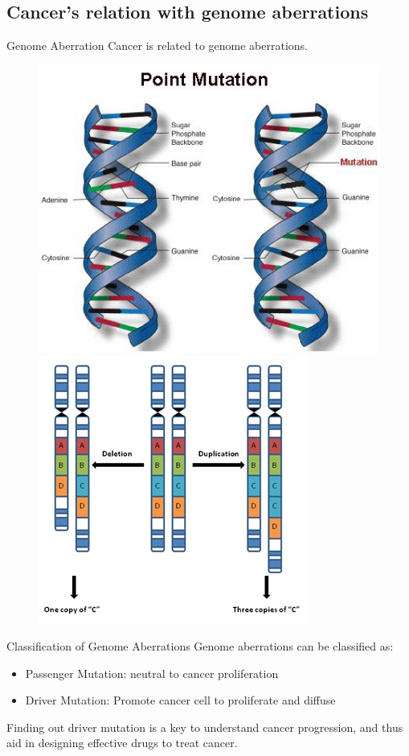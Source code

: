 \documentclass[xcolor=dvipsnames]{beamer}
\begin{document}
\subsection{Cancer's relation with genome aberrations}
\begin{frame}{Genome Aberration}
Cancer is related to genome aberrations.\\
\begin{figure}
\includegraphics[width=0.45\linewidth]{genemutations.png}
\includegraphics[width=0.45\linewidth]{cnv.png}
\end{figure}
\end{frame}
\begin{frame}{Classification of Genome Aberrations}
Genome aberrations can be classified as:
\begin{itemize}
\item Passenger Mutation: neutral to cancer proliferation\\
\item Driver Mutation: Promote cancer cell to proliferate and diffuse
\end{itemize}
Finding out driver mutation is a key to understand cancer progression, and thus aid in designing effective drugs to treat cancer.\\
\end{frame}
\end{document}
